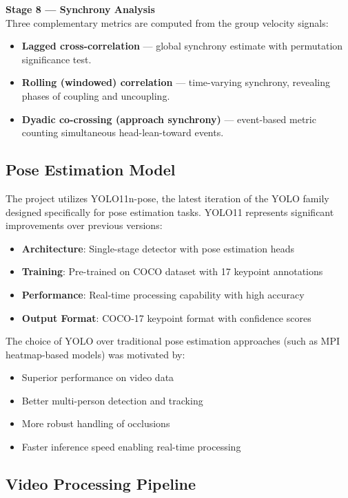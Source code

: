 \documentclass[11pt]{article}
\begin{document}
\vspace{0.5em}
\noindent\textbf{Stage 8 — Synchrony Analysis}\\
Three complementary metrics are computed from the group velocity signals:
\begin{itemize}
    \item \textbf{Lagged cross-correlation} — global synchrony estimate with permutation significance test.
    \item \textbf{Rolling (windowed) correlation} — time-varying synchrony, revealing phases of coupling and uncoupling.
    \item \textbf{Dyadic co-crossing (approach synchrony)} — event-based metric counting simultaneous head-lean-toward events.
\end{itemize}

\subsection{Pose Estimation Model}
The project utilizes YOLO11n-pose, the latest iteration of the YOLO family designed specifically for pose estimation tasks. YOLO11 represents significant improvements over previous versions:

\begin{itemize}
    \item \textbf{Architecture}: Single-stage detector with pose estimation heads
    \item \textbf{Training}: Pre-trained on COCO dataset with 17 keypoint annotations
    \item \textbf{Performance}: Real-time processing capability with high accuracy
    \item \textbf{Output Format}: COCO-17 keypoint format with confidence scores
\end{itemize}

The choice of YOLO over traditional pose estimation approaches (such as MPI heatmap-based models) was motivated by:
\begin{itemize}
    \item Superior performance on video data
    \item Better multi-person detection and tracking
    \item More robust handling of occlusions
    \item Faster inference speed enabling real-time processing
\end{itemize}

\subsection{Video Processing Pipeline}
\end{document}
